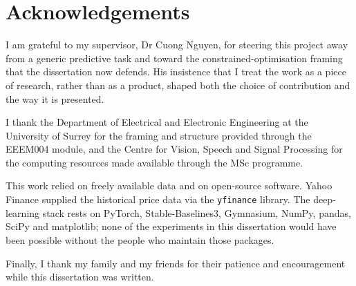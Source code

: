 \chapter*{Acknowledgements}

I am grateful to my supervisor, Dr Cuong Nguyen, for steering this project away from a generic predictive task and toward the constrained-optimisation framing that the dissertation now defends. His insistence that I treat the work as a piece of research, rather than as a product, shaped both the choice of contribution and the way it is presented.

I thank the Department of Electrical and Electronic Engineering at the University of Surrey for the framing and structure provided through the EEEM004 module, and the Centre for Vision, Speech and Signal Processing for the computing resources made available through the MSc programme.

This work relied on freely available data and on open-source software. Yahoo Finance supplied the historical price data via the \texttt{yfinance} library. The deep-learning stack rests on PyTorch, Stable-Baselines3, Gymnasium, NumPy, pandas, SciPy and matplotlib; none of the experiments in this dissertation would have been possible without the people who maintain those packages.

Finally, I thank my family and my friends for their patience and encouragement while this dissertation was written.
